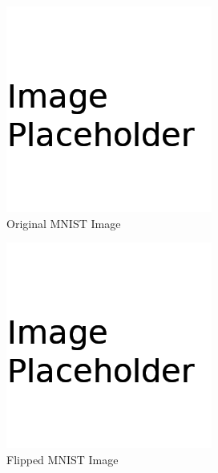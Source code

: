 \documentclass[conference]{IEEEtran}
\begin{document}
\begin{figure}[H]
  \centering
  \includegraphics[width=0.8\linewidth]{figures/placeholder.png}
  \caption{Original MNIST Image~\cite{mnist_dataset}}%
  \label{fig:MNIST-OriginalImage}
\end{figure}


\begin{figure}[H]
  \centering
  \includegraphics[width=0.8\linewidth]{figures/placeholder.png}
  \caption{Flipped MNIST Image~\cite{mnist_dataset}}%
  \label{fig:MNIST-RotatedImage}
\end{figure}
\end{document}
